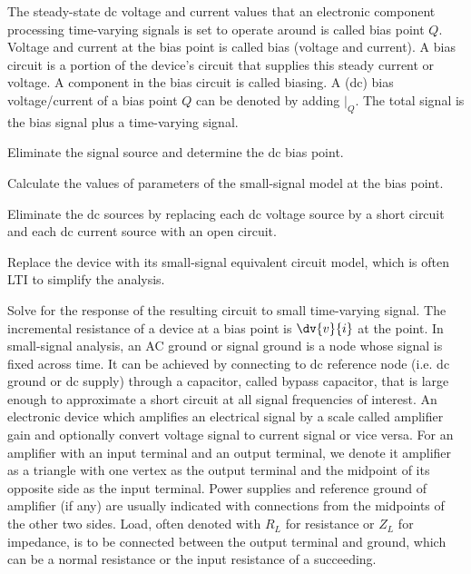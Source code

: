 \documentclass[a4paper,12pt]{report}
\begin{document}
The steady-state dc voltage and current values that an electronic component processing time-varying signals is set to operate around is called bias point $Q$. Voltage and current at the bias point is called bias (voltage and current). A bias circuit is a portion of the device's circuit that supplies this steady current or voltage. A component in the bias circuit is called biasing. A (dc) bias voltage/current of a bias point $Q$ can be denoted by adding $\vert_Q$. The total signal is the bias signal plus a time-varying signal.
\bit
\item Eliminate the signal source and determine the dc bias point.
\item Calculate the values of parameters of the small-signal model at the bias point.
\item Eliminate the dc sources by replacing each dc voltage source by a short circuit and each dc current source with an open circuit.
\item Replace the device with its small-signal equivalent circuit model, which is often LTI to simplify the analysis.
\item Solve for the response of the resulting circuit to small time-varying signal.
\eit
{}
The incremental resistance of a device at a bias point is $\dv{v}{i}$ at the point.
In small-signal analysis, an AC ground or signal ground is a node whose signal is fixed across time. It can be achieved by connecting to dc reference node (i.e. dc ground or dc supply) through a capacitor, called bypass capacitor, that is large enough to approximate a short circuit at all signal frequencies of interest.
An electronic device which amplifies an electrical signal by a scale called amplifier gain and optionally convert voltage signal to current signal or vice versa.
For an amplifier with an input terminal and an output terminal, we denote it amplifier as a triangle with one vertex as the output terminal and the midpoint of its opposite side as the input terminal. Power supplies and reference ground of amplifier (if any) are usually indicated with connections from the midpoints of the other two sides. Load, often denoted with $R_L$ for resistance or $Z_L$ for impedance, is to be connected between the output terminal and ground, which can be a normal resistance or the input resistance of a succeeding.
\end{document}
